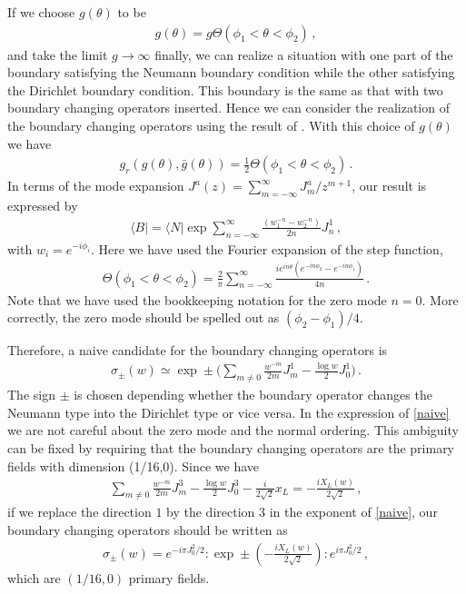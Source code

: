 \documentclass[12pt]{article}
\begin{document}
If we choose $g(\theta)$ to be
\begin{align}
g(\theta)=g\Theta(\phi_1<\theta<\phi_2)\,,
\end{align}
and take the limit $g\to\infty$ finally, we can realize a situation
with one part of the boundary satisfying the Neumann boundary
condition while the other satisfying the Dirichlet boundary
condition.
This boundary is the same as that with two boundary changing operators
inserted.
Hence we can consider the realization of the boundary changing
operators using the result of \cite{KT}.
With this choice of $g(\theta)$ we have
\begin{align}
g_r(g(\theta),\bar g(\theta))=
\frac{1}{2}\Theta(\phi_1<\theta<\phi_2)\,.
\end{align}
In terms of the mode expansion
$J^a(z)=\sum_{m=-\infty}^\infty J^a_m/z^{m+1}$, our result is
expressed by
\begin{align}
\langle B|=\langle N|\exp\sum_{n=-\infty}^{\infty}
\frac{(w^{-n}_1-w^{-n}_2)}{2n}J_n^1\,,
\end{align}
with $w_i=e^{-i\phi_i}$.
Here we have used the Fourier expansion of the step function,
\begin{align}
\Theta(\phi_1<\theta<\phi_2)=
\frac{2}{\pi}\sum_{n=-\infty}^{\infty}
\frac{ie^{in\theta}(e^{-in\phi_2}-e^{-in\phi_1})}{4n}\,.
\end{align}
Note that we have used the bookkeeping notation for the zero mode
$n=0$.
More correctly, the zero mode should be spelled out as
$(\phi_2-\phi_1)/4$.

Therefore, a naive candidate for the boundary changing operators is
\begin{align}
\sigma_\pm(w)\simeq\exp\pm\Biggl(\sum_{m\neq 0}\frac{w^{-m}}{2m}J_m^1
-\frac{\log w}{2}J_0^1\Biggr)\,.
\label{naive}
\end{align}
The sign $\pm$ is chosen depending whether the boundary operator
changes the Neumann type into the Dirichlet type or vice versa.
In the expression of \eqref{naive} we are not careful about the zero
mode and the normal ordering.
This ambiguity can be fixed by requiring that the boundary changing
operators are the primary fields with dimension (1/16,0).
Since we have
\begin{align}
\sum_{m\neq 0}\frac{w^{-m}}{2m}J_m^3
-\frac{\log w}{2}J_0^3-\frac{i}{2\sqrt{2}}x_L
=-\frac{iX_L(w)}{2\sqrt{2}}\,,
\end{align}
if we replace the direction $1$ by the direction $3$ in the exponent
of \eqref{naive}, our boundary changing operators should be written as
\begin{align}
\sigma_\pm(w)=e^{-i\pi J^2_0/2}
:\exp\pm\left(-\frac{iX_L(w)}{2\sqrt{2}}\right):
e^{i\pi J^2_0/2}\,,
\label{freefield}
\end{align}
which are $(1/16,0)$ primary fields.
\end{document}
